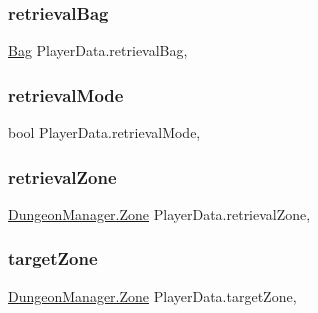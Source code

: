 \subsubsection{\texorpdfstring{retrievalBag}{retrievalBag}}
{\footnotesize\ttfamily \mbox{\hyperlink{class_bag}{Bag}} Player\+Data.\+retrieval\+Bag\hspace{0.3cm}{\ttfamily [get]}, {\ttfamily [set]}}

\mbox{\label{class_player_data_ae258f6bda605a5d3c9d4d701af4bf4d4}} 
\subsubsection{\texorpdfstring{retrievalMode}{retrievalMode}}
{\footnotesize\ttfamily bool Player\+Data.\+retrieval\+Mode\hspace{0.3cm}{\ttfamily [get]}, {\ttfamily [set]}}

\mbox{\label{class_player_data_aed5e24eed1db76e3d8954ab05e8f342c}} 
\subsubsection{\texorpdfstring{retrievalZone}{retrievalZone}}
{\footnotesize\ttfamily \mbox{\hyperlink{class_dungeon_manager_a6558d4a01889674bf25c798f1b90a431}{Dungeon\+Manager.\+Zone}} Player\+Data.\+retrieval\+Zone\hspace{0.3cm}{\ttfamily [get]}, {\ttfamily [set]}}

\mbox{\label{class_player_data_a5671b8f488e96c5263bb062200ae781a}} 
\subsubsection{\texorpdfstring{targetZone}{targetZone}}
{\footnotesize\ttfamily \mbox{\hyperlink{class_dungeon_manager_a6558d4a01889674bf25c798f1b90a431}{Dungeon\+Manager.\+Zone}} Player\+Data.\+target\+Zone\hspace{0.3cm}{\ttfamily [get]}, {\ttfamily [set]}}

